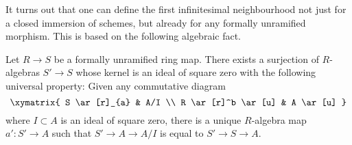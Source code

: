 \noindent
It turns out that one can define the first infinitesimal neighbourhood
not just for a closed immersion of schemes, but already for any formally
unramified morphism. This is based on the following algebraic fact.

\begin{lemma}
\label{lemma-universal-thickening}
Let $R \to S$ be a formally unramified ring map. There exists a surjection of
$R$-algebras $S' \to S$ whose kernel is an ideal of square zero with the
following universal property: Given any commutative diagram
$$
\xymatrix{
S \ar[r]_{a} & A/I \\
R \ar[r]^b \ar[u] & A \ar[u]
}
$$
where $I \subset A$ is an ideal of square zero, there is a unique $R$-algebra
map $a' : S' \to A$ such that $S' \to A \to A/I$ is equal to $S' \to S \to A$.
\end{lemma}


